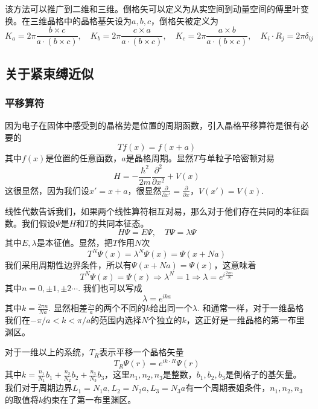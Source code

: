 \documentclass{article}
\numberwithin{equation}{subsection}
\begin{document}
该方法可以推广到二维和三维。倒格矢可以定义为从实空间到动量空间的傅里叶变换。在三维晶格中的晶格基矢设为$a,b,c$，倒格矢被定义为
\begin{equation}
    K_a=2\pi\frac{b\times c}{a\cdot(b\times c)},\quad K_b=2\pi\frac{c\times a}{a\cdot(b\times c)},\quad K_c=2\pi\frac{a\times b}{a\cdot(b\times c)},\quad K_i\cdot R_j=2\pi\delta_{ij}
\end{equation}
\subsection*{关于紧束缚近似}
\subsubsection*{平移算符}
因为电子在固体中感受到的晶格势是位置的周期函数，引入晶格平移算符是很有必要的
\begin{equation}
    Tf(x)=f(x+a)
\end{equation}
其中$f(x)$是位置的任意函数，$a$是晶格周期。显然$T$与单粒子哈密顿对易
\begin{equation}
    H=-\frac{\hbar^2}{2m}\frac{\partial^2}{\partial x^2}+V(x)
\end{equation}
这很显然，因为我们设$x'=x+a$，很显然$\frac{\partial}{\partial x'}=\frac{\partial}{\partial x}$，$V(x')=V(x)$.

线性代数告诉我们，如果两个线性算符相互对易，那么对于他们存在共同的本征函数。我们假设$\Psi$是$H$和$T$的共同本征态。
\begin{equation}
    H\Psi=E\Psi,\quad T\Psi=\lambda\Psi
\end{equation}
其中$E,\lambda$是本征值。显然，把$T$作用$N$次
\begin{equation}
    T^N\Psi(x)=\lambda^N\Psi(x)=\Psi(x+Na)
\end{equation}
我们采用周期性边界条件，所以有$\Psi(x+Na)=\Psi(x)$，这意味着
\begin{equation}
    T^N\Psi(x)=\Psi(x)\Longrightarrow\lambda^N=1\Longrightarrow\lambda=e^{i\frac{2\pi n}{N}}
\end{equation}
其中$n=0,\pm1,\pm2\cdots$. 我们也可以写成
\begin{equation}
    \lambda=e^{ika}
\end{equation}
其中$k=\frac{2\pi n}{Na}$. 显然相差$\frac{2\pi}{a}$的两个不同的$k$给出同一个$\lambda$. 和通常一样，对于一维晶格我们在$-\pi/a<k<\pi/a$的范围内选择$N$个独立的$k$，这正好是一维晶格的第一布里渊区。

对于一维以上的系统，$T_R$表示平移一个晶格矢量
\begin{equation}
    T_R\Psi(r)=e^{ik\cdot R}\Psi(r)
\end{equation}
其中$k=\frac{n_1}{N_1}b_1+\frac{n_2}{N_2}b_2+\frac{n_3}{N_3}b_3$，这里$n_1,n_2,n_3$是整数，$b_1,b_2,b_3$是倒格子的基矢量。我们对于周期边界$L_1=N_1a,L_2=N_2a,L_3=N_3a$有一个周期表姐条件，$n_1,n_2,n_3$的取值将$k$约束在了第一布里渊区。
\end{document}
